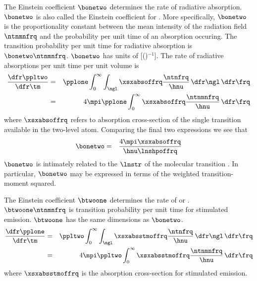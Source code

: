 \documentclass[12pt]{article}
\begin{document}
The Einstein coefficient $\bonetwo$ determines the rate of radiative
absorption. 
$\bonetwo$ is also called the Einstein coefficient for
.
More specifically, $\bonetwo$ is the proportionality constant
between the mean intensity of the radiation field $\ntnmnfrq$ and the
probability per unit time of an absorption occuring.
The transition probability per unit time for radiative absorption
is $\bonetwo \ntnmnfrq$.
$\bonetwo$ has units of [\xs(\wxmSsrhz)$^{-1}$].
The rate of radiative absorptions per unit time per unit volume is 
\begin{eqnarray}
\frac{\dfr \ppltwo}{\dfr\tm} 
& = & \pplone 
\int_{0}^{\infty} \int_{\ngl} 
\xsxabsoffrq \frac{\ntnfrq}{\hnu}
\,\dfr\ngl \,\dfr\frq
\nonumber \\
& = & 4\mpi \pplone 
\int_{0}^{\infty} \xsxabsoffrq \frac{\ntnmnfrq}{\hnu} \,\dfr\frq
\label{eqn:dfeq_b12}
\end{eqnarray}
where $\xsxabsoffrq$ refers to absorption cross-section of the
single transition available in the two-level atom.
Comparing the final two expressions we see that 
\begin{eqnarray}
\bonetwo & = & \frac{4\mpi \xsxabsoffrq}{\hnu \lnshpoffrq}
\label{eqn:b12_mcr_dfn}
\end{eqnarray}
$\bonetwo$ is intimately related to the  $\lnstr$
of the molecular transition \cite[][p.~709]{RRG98}. 
In particular, $\bonetwo$ may be expressed in terms of the weighted
transition-moment squared.

The Einstein coefficient $\btwoone$ determines the rate of 
 or .
$\btwoone \ntnmnfrq$ is transition probability per
unit time for stimulated emission.
$\btwoone$ has the same dimensions as $\bonetwo$.
\begin{eqnarray}
\frac{\dfr \pplone}{\dfr\tm} 
& = & \ppltwo
\int_{0}^{\infty} \int_{\ngl} 
\xsxabsstmoffrq \frac{\ntnfrq}{\hnu}
\,\dfr\ngl \,\dfr\frq
\nonumber \\
& = & 4\mpi \ppltwo
\int_{0}^{\infty} \xsxabsstmoffrq \frac{\ntnmnfrq}{\hnu} \,\dfr\frq
\label{eqn:dfeq_b21}
\end{eqnarray}
where $\xsxabsstmoffrq$ is the absorption cross-section for
stimulated emission.
\end{document}
